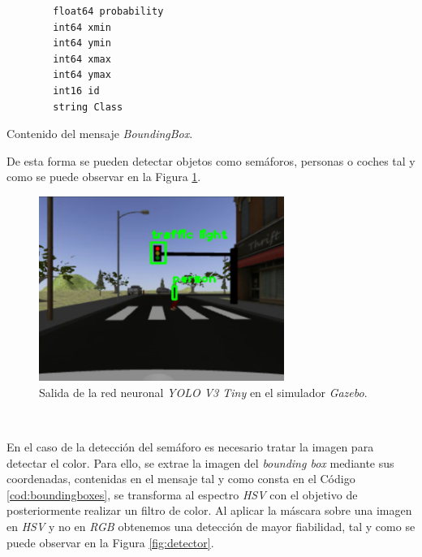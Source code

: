 \begin{code}[h]
	\begin{lstlisting}
		float64 probability
		int64 xmin
		int64 ymin
		int64 xmax
		int64 ymax
		int16 id
		string Class
	\end{lstlisting}
	\caption[Contenido del mensaje \textit{BoundingBox}.]{Contenido del mensaje \textit{BoundingBox}.}
	\label{cod:boundingboxes}
\end{code}

De esta forma se pueden detectar objetos como semáforos, personas o coches tal y como se puede observar en la Figura \ref{fig:darknetsimulator}.\\

\begin{figure} [h!]
	\begin{center}
		\includegraphics[width=8cm]{figs/darknetSimulator}
	\end{center}
	\caption{Salida de la red neuronal \textit{YOLO V3 Tiny} en el simulador \textit{Gazebo}.}
	\label{fig:darknetsimulator}
\end{figure}\

En el caso de la detección del semáforo es necesario tratar la imagen para detectar el color. Para ello, se extrae la imagen del \textit{bounding box} mediante sus coordenadas,
contenidas en el mensaje tal y como consta en el Código \ref{cod:boundingboxes}, se transforma al espectro \textit{HSV} con el objetivo de posteriormente realizar un filtro de
color. Al aplicar la máscara sobre una imagen en \textit{HSV} y no en \textit{RGB} obtenemos una detección de mayor fiabilidad, tal y como se puede observar en la Figura
\ref{fig:detector}.\\

